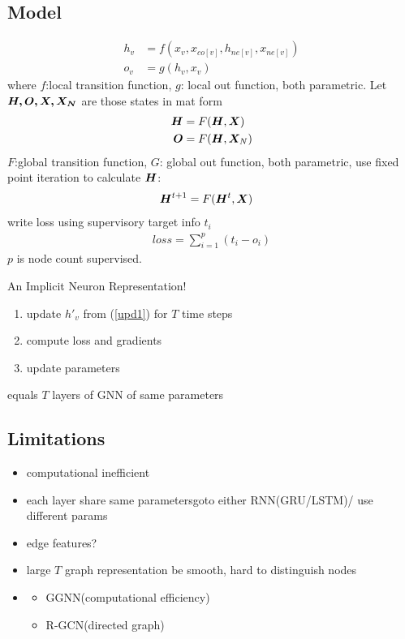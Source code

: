 \documentclass{article}
\begin{document}
\subsection{Model} 
\begin{align}
    \label{upd1}
    h_v&=f(x_v, x_{co[v]}, h_{ne[v]}, x_{ne[v]})\\
    o_v&=g(h_v,x_v)
\end{align}
where $f$:local transition function, $g$: local out function, both parametric. Let $\boldsymbol{H, O, X, X_N}$ are those states in mat form
\begin{align}
    \boldsymbol{H}&=F(\boldsymbol{H}, \boldsymbol{X})\\
    \boldsymbol{O}&=F(\boldsymbol{H}, \boldsymbol{X}_N)
\end{align}
$F$:global transition function, $G$: global out function, both parametric, use fixed point iteration to calculate $\boldsymbol{H}$:
\begin{align}
    \boldsymbol{H}^{t+1}&=F(\boldsymbol{H}^t, \boldsymbol{X})
\end{align}
write loss using supervisory target info $t_i$
\begin{align}
    loss=\sum_{i=1}^p(t_i-o_i)
\end{align}
$p$ is node count supervised.

\note An Implicit Neuron Representation!

\alg 
\begin{enumerate}
    \item update $h'_v$ from (\ref{upd1}) for $T$ time steps
    \item compute loss and gradients
    \item update parameters
\end{enumerate}

\note equals $T$ layers of GNN of same parameters
 
\subsection{Limitations}

\begin{itemize}
    \item computational inefficient
    \item each layer share same parameters\tRarr goto either RNN(GRU/LSTM)/ use different params
    \item edge features?
    \item large $T$ \trarr graph representation be smooth, hard to distinguish nodes
    \item {} 
    \begin{itemize}
        \item GGNN(computational efficiency)
        \item R-GCN(directed graph)
    \end{itemize}
\end{itemize}
\end{document}
